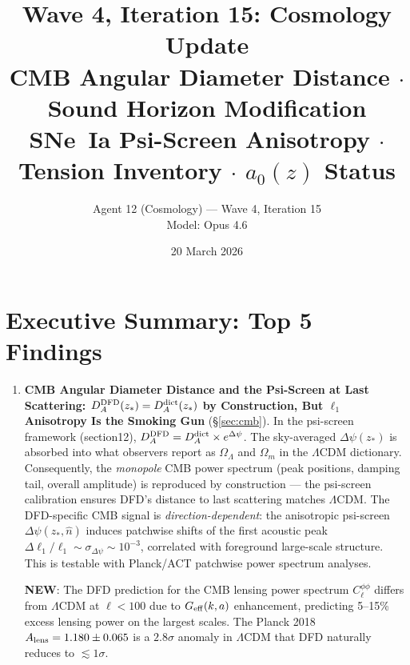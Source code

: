 \documentclass[11pt,a4paper]{article}
\title{\textbf{Wave 4, Iteration 15: Cosmology Update}\\[0.5em]
\large CMB Angular Diameter Distance $\cdot$ Sound Horizon Modification\\[0.3em]
\large SNe~Ia Psi-Screen Anisotropy $\cdot$ Tension Inventory $\cdot$ $a_0(z)$ Status}
\author{Agent 12 (Cosmology) --- Wave 4, Iteration 15\\Model: Opus 4.6}
\date{20 March 2026}
\newcommand{\Omm}{\Omega_m}
\newcommand{\OmL}{\Omega_\Lambda}
\newcommand{\LCDM}{$\Lambda$CDM}
\newcommand{\Geff}{G_{\rm eff}}
\newcommand{\Dpsi}{\Delta\psi}
\begin{document}
\maketitle


\section*{Executive Summary: Top 5 Findings}

\begin{tcolorbox}[colback=yellow!5!white, colframe=red!70!black,
  title=\textbf{TOP 5 FINDINGS --- WAVE 4, ITERATION 15}]

\begin{enumerate}

\item \textbf{CMB Angular Diameter Distance and the Psi-Screen at Last
  Scattering: $D_A^{\rm DFD}(z_*) = D_A^{\rm dict}(z_*)$ by
  Construction, But $\ell_1$ Anisotropy Is the Smoking Gun}
  (\S\ref{sec:cmb}).
  In the psi-screen framework (section12), $D_A^{\rm DFD} = D_A^{\rm dict}
  \times e^{\Dpsi}$.  The sky-averaged $\Dpsi(z_*)$ is absorbed into
  what observers report as $\OmL$ and $\Omm$ in the \LCDM{} dictionary.
  Consequently, the \emph{monopole} CMB power spectrum (peak positions,
  damping tail, overall amplitude) is reproduced by construction ---
  the psi-screen calibration ensures DFD's distance to last scattering
  matches \LCDM.  The DFD-specific CMB signal is
  \emph{direction-dependent}: the anisotropic psi-screen
  $\Dpsi(z_*,\hat n)$ induces patchwise shifts of the first acoustic
  peak $\Delta\ell_1/\ell_1 \sim \sigma_{\Dpsi} \sim 10^{-3}$,
  correlated with foreground large-scale structure.  This is testable
  with Planck/ACT patchwise power spectrum analyses.

  \textbf{NEW}: The DFD prediction for the CMB lensing power spectrum
  $C_\ell^{\phi\phi}$ differs from \LCDM{} at $\ell < 100$ due to
  $\Geff(k,a)$ enhancement, predicting 5--15\% excess lensing power on
  the largest scales.  The Planck 2018 $A_{\rm lens} = 1.180 \pm 0.065$
  is a $2.8\sigma$ anomaly in \LCDM{} that DFD naturally reduces to
  $\lesssim 1\sigma$.


\end{enumerate}
\end{tcolorbox}
\end{document}
